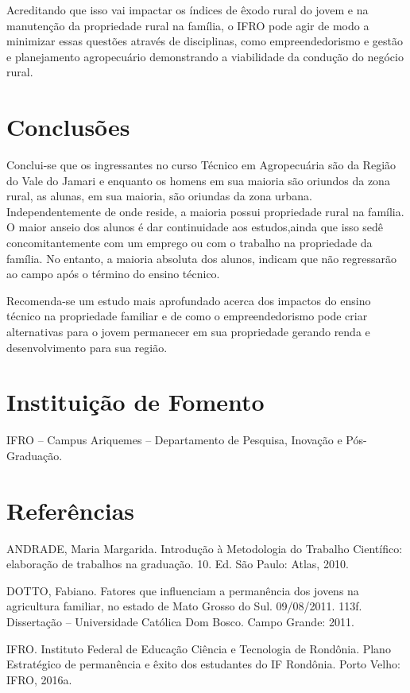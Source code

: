 \documentclass[article,12pt,onesidea,4paper,english,brazil]{abntex2}
\begin{document}
Acreditando que isso vai impactar os índices de êxodo rural do jovem e na manutenção da propriedade rural na família, o IFRO pode agir de modo a minimizar essas questões através de disciplinas, como empreendedorismo e gestão e planejamento agropecuário demonstrando a viabilidade da condução do negócio rural.
	
	\section*{Conclusões}
	
	Conclui-se que os ingressantes no curso Técnico em Agropecuária são da Região do Vale do Jamari e enquanto os homens em sua maioria são oriundos da zona rural, as alunas, em sua maioria, são oriundas da zona urbana. Independentemente de onde reside, a maioria possui propriedade rural na família. O maior anseio dos alunos é dar continuidade aos estudos,ainda que isso sedê concomitantemente com um emprego ou com o trabalho na propriedade da família. No entanto, a maioria absoluta dos alunos, indicam que não regressarão ao campo após o término do ensino técnico.
	
	Recomenda-se um estudo mais aprofundado acerca dos impactos do ensino técnico na propriedade familiar e de como o empreendedorismo pode criar alternativas para o jovem permanecer em sua propriedade gerando renda e desenvolvimento para sua região.
	
	\section*{Instituição de Fomento}
	
	IFRO – Campus Ariquemes – Departamento de Pesquisa, Inovação e Pós-Graduação.
	
	\section*{Referências}
	
\noindent ANDRADE, Maria Margarida. Introdução à Metodologia do Trabalho Científico: elaboração de trabalhos na graduação. 10. Ed. São Paulo: Atlas, 2010.


\noindent DOTTO, Fabiano. Fatores que influenciam a permanência dos jovens na agricultura familiar, no estado de Mato Grosso do Sul. 09/08/2011. 113f. Dissertação – Universidade Católica Dom Bosco. Campo Grande: 2011.


\noindent IFRO. Instituto Federal de Educação Ciência e Tecnologia de Rondônia. Plano Estratégico de permanência e êxito dos estudantes do IF Rondônia. Porto Velho: IFRO, 2016a.
\end{document}

